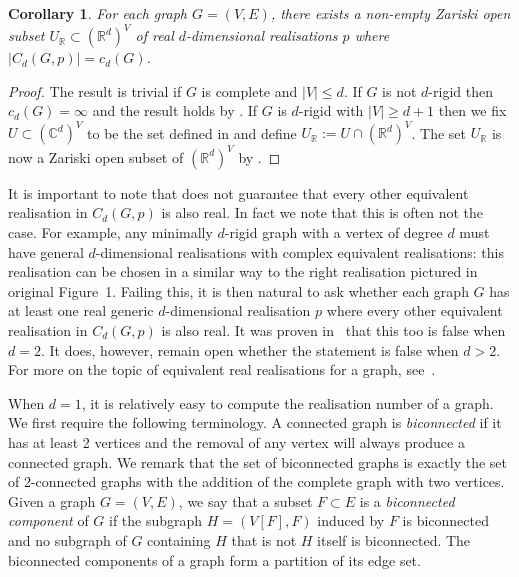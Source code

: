 \documentclass[11pt]{article}
\newtheorem{corollary}[theo]{Corollary}
\theoremstyle{definition}
\numberwithin{equation}{section}
\begin{document}
\begin{corollary}\label{cor:realstuff}
	For each graph $G=(V,E)$,
	there exists a non-empty Zariski open subset $U_\mathbb{R} \subset (\mathbb{R}^d)^V$ of real $d$-dimensional realisations $p$ where $|C_d(G,p)| = c_d(G)$.
\end{corollary}

\begin{proof}
	The result is trivial if $G$ is complete and $|V| \leq d$.	
	If $G$ is not $d$-rigid then $c_d(G) = \infty$ and the result holds by .
	If $G$ is $d$-rigid with $|V| \geq d+1$ then we fix $U \subset (\mathbb{C}^d)^V$ to be the set defined in  and define $U_{\mathbb{R}} := U \cap (\mathbb{R}^d)^V$.
	The set $U_{\mathbb{R}}$ is now a Zariski open subset of $(\mathbb{R}^d)^V$ by .
\end{proof}

It is important to note that  does not guarantee that every other equivalent realisation in $C_d(G,p)$ is also real.
In fact we note that this is often not the case.
For example, any minimally $d$-rigid graph with a vertex of degree $d$ must have general $d$-dimensional realisations with complex equivalent realisations:
this realisation can be chosen in a similar way to the right realisation pictured in original Figure~1.
Failing this,
it is then natural to ask whether each graph $G$ has at least one real generic $d$-dimensional realisation $p$ where every other equivalent realisation in $C_d(G,p)$ is also real.
It was proven in~\cite{JacksonOwen} that this too is false when $d=2$.
It does, however, remain open whether the statement is false when $d>2$.
For more on the topic of equivalent real realisations for a graph,
see~\cite{Bartzos2021}.


When $d=1$, it is relatively easy to compute the realisation number of a graph.
We first require the following terminology.
A connected graph is \emph{biconnected} if it has at least 2 vertices and the removal of any vertex will always produce a connected graph.
We remark that the set of biconnected graphs is exactly the set of 2-connected graphs with the addition of the complete graph with two vertices.
Given a graph $G=(V,E)$, we say that a subset $F \subset E$ is a \emph{biconnected component} of $G$ if the subgraph $H=(V[F],F)$ induced by $F$ is biconnected and no subgraph of $G$ containing $H$ that is not $H$ itself is biconnected.
The biconnected components of a graph form a partition of its edge set.
\end{document}

